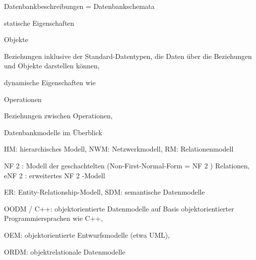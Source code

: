 \documentclass[a4paper]{article}
\begin{document}
\begin{multicols}{3}
Datenbankbeschreibungen = Datenbankschemata

\begin{enumerate*}
    \item statische Eigenschaften
    \begin{itemize*}
        \item Objekte
        \item Beziehungen inklusive der Standard-Datentypen, die Daten über die Beziehungen und Objekte darstellen können,
    \end{itemize*}
    \item dynamische Eigenschaften wie
    \begin{itemize*}
        \item Operationen
        \item Beziehungen zwischen Operationen,
    \end{itemize*}
\end{enumerate*}

Datenbankmodelle im Überblick
\begin{itemize*}
    \item HM: hierarchisches Modell, NWM: Netzwerkmodell, RM: Relationenmodell
    \item NF 2 : Modell der geschachtelten (Non-First-Normal-Form = NF 2 ) Relationen, eNF 2 : erweitertes NF 2 -Modell
    \item ER: Entity-Relationship-Modell, SDM: semantische Datenmodelle
    \item OODM / C++: objektorientierte Datenmodelle auf Basis objektorientierter Programmiersprachen wie C++,
    \begin{itemize*}
        \item OEM: objektorientierte Entwurfsmodelle (etwa UML),
        \item ORDM: objektrelationale Datenmodelle
    \end{itemize*}
\end{itemize*}


\end{multicols}
\end{document}
